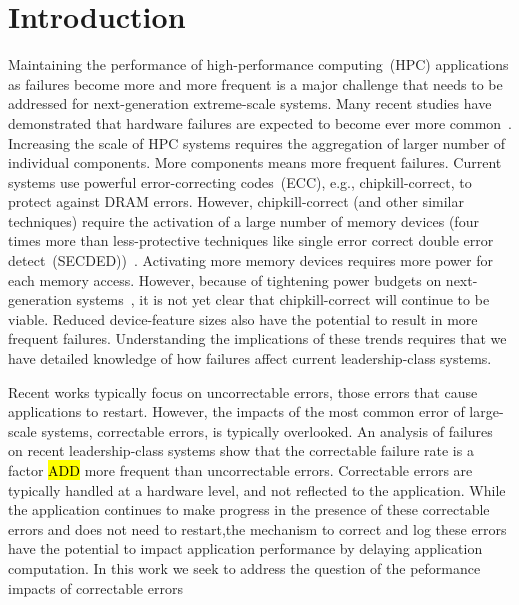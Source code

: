 
\section{Introduction}
\label{sec:intro}

Maintaining the performance of high-performance computing~(HPC) applications as
failures become more and more frequent is a major challenge that needs to be
addressed for next-generation extreme-scale systems.  Many recent studies have
demonstrated that hardware failures are expected to become ever more
common~\cite{Bergman08exascalecomputing}.  Increasing the scale of HPC systems
requires the aggregation of larger number of individual components.  More
components means more frequent failures.  Current systems use powerful
error-correcting codes~(ECC), e.g., chipkill-correct, to protect against DRAM
errors.  However, chipkill-correct (and other similar techniques) require the
activation of a large number of memory devices (four times more than
less-protective techniques like single error correct double error
detect~(SECDED))~\cite{Jian13}.  Activating more memory devices requires more
power for each memory access.  However, because of tightening power budgets on
next-generation systems~\cite{Bergman08exascalecomputing}, it is not yet clear
that chipkill-correct will continue to be viable.  Reduced device-feature sizes
also have the potential to result in more frequent failures.  Understanding the
implications of these trends requires that we have detailed knowledge of how
failures affect current leadership-class systems.

Recent works typically focus on uncorrectable errors, those errors that cause
applications to restart.  However, the impacts of the most common error of
large-scale systems, correctable errors, is typically overlooked. An analysis of
failures on recent leadership-class systems show that the correctable failure
rate is a factor \hl{ADD} more frequent than uncorrectable errors.  Correctable
errors are typically handled at a hardware level, and not reflected to the
application.  While the application continues to make progress in the presence
of these correctable errors and does not need to restart,the mechanism to
correct and log these errors have the potential to impact application
performance by delaying application computation. In this work we seek to address
the question of the peformance impacts of correctable errors


\label{fig:propagation}

